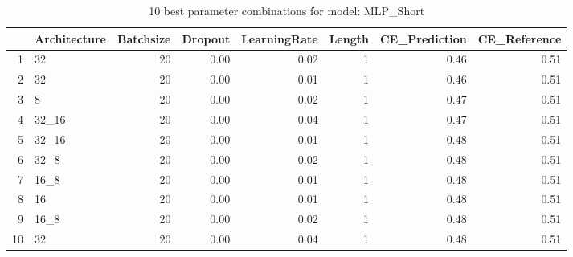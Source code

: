 \begin{table}[ht]
\centering
\begin{tabular}{rlrrrrrr}
  \hline
 & Architecture & Batchsize & Dropout & LearningRate & Length & CE\_Prediction & CE\_Reference \\ 
  \hline
1 & 32 &  20 & 0.00 & 0.02 &   1 & 0.46 & 0.51 \\ 
  2 & 32 &  20 & 0.00 & 0.01 &   1 & 0.46 & 0.51 \\ 
  3 & 8 &  20 & 0.00 & 0.02 &   1 & 0.47 & 0.51 \\ 
  4 & 32\_16 &  20 & 0.00 & 0.04 &   1 & 0.47 & 0.51 \\ 
  5 & 32\_16 &  20 & 0.00 & 0.01 &   1 & 0.48 & 0.51 \\ 
  6 & 32\_8 &  20 & 0.00 & 0.02 &   1 & 0.48 & 0.51 \\ 
  7 & 16\_8 &  20 & 0.00 & 0.01 &   1 & 0.48 & 0.51 \\ 
  8 & 16 &  20 & 0.00 & 0.01 &   1 & 0.48 & 0.51 \\ 
  9 & 16\_8 &  20 & 0.00 & 0.02 &   1 & 0.48 & 0.51 \\ 
  10 & 32 &  20 & 0.00 & 0.04 &   1 & 0.48 & 0.51 \\ 
   \hline
\end{tabular}
\caption{10 best parameter combinations for model: MLP_Short} 
\label{tab:MLP_Short_top_10}
\end{table}
